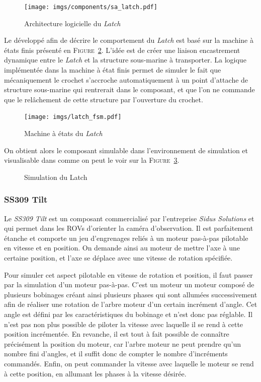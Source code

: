 				\begin{figure}[!htb]
					\centering
					\texttt{[image: imgs/components/sa\_latch.pdf]}
					\caption{Architecture logicielle du \textit{Latch}}
					\label{fig:sa_latch}
				\end{figure}
							
				Le \plugin{} \gazebo{} développé afin de décrire le comportement du \textit{Latch} est basé sur la machine à états finis présenté en \textsc{Figure}~\ref{fig:latch_fsm}. L'idée est de créer une liaison encastrement dynamique entre le \textit{Latch} et la structure sous-marine à transporter. La logique implémentée dans la machine à état finis permet de simuler le fait que mécaniquement le crochet s'accroche automatiquement à un point d'attache de structure sous-marine qui rentrerait dans le composant, et que l'on ne commande que le relâchement de cette structure par l'ouverture du crochet.

				\begin{figure}[!htb]
					\centering
					\texttt{[image: imgs/latch\_fsm.pdf]}
					\caption{Machine à états du \textit{Latch}}
					\label{fig:latch_fsm}
				\end{figure}

				On obtient alors le composant simulable dans l'environnement de simulation \gazebo{} et visualisable dans \rviz{} comme on peut le voir sur la \textsc{Figure}~\ref{fig:latch_gazebo_rviz}.

				\begin{figure}[!htb]
					\centering
					\caption{Simulation du Latch}
					\label{fig:latch_gazebo_rviz}
				\end{figure}
		
			\subsubsection{SS309 Tilt}

				Le \textit{SS309 Tilt} est un composant commercialisé par l'entreprise \textit{Sidus Solutions} et qui permet dans les \gls{ROV}s d'orienter la caméra d'observation. Il est parfaitement étanche et comporte un jeu d'engrenages reliés à un moteur pas-à-pas pilotable en vitesse et en position. On demande ainsi au moteur de mettre l'axe à une certaine position, et l'axe se déplace avec une vitesse de rotation spécifiée.
			
				Pour simuler cet aspect pilotable en vitesse de rotation et position, il faut passer par la simulation d'un moteur pas-à-pas. C'est un moteur un moteur composé de plusieurs bobinages créant ainsi plusieurs phases qui sont allumées successivement afin de réaliser une rotation de l'arbre moteur d'un certain incrément d'angle. Cet angle est défini par les caractéristiques du bobinage et n'est donc pas réglable. Il n'est pas non plus possible de piloter la vitesse avec laquelle il se rend à cette position incrémentée. En revanche, il est tout à fait possible de connaître précisément la position du moteur, car l'arbre moteur ne peut prendre qu'un nombre fini d'angles, et il suffit donc de compter le nombre d'incréments commandés. Enfin, on peut commander la vitesse avec laquelle le moteur se rend à cette position, en allumant les phases à la vitesse désirée.

